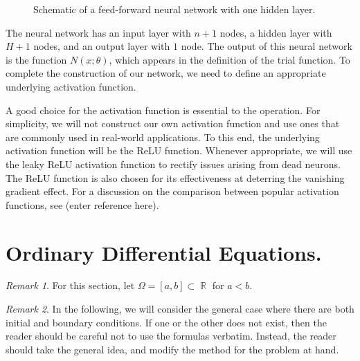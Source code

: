 \documentclass[10pt]{article}
\theoremstyle{plain}
\theoremstyle{definition}
\theoremstyle{remark}
\newtheorem{remark}{Remark}[section]
\numberwithin{theorem}{section}
\numberwithin{proposition}{section}
\numberwithin{remark}{section}
\numberwithin{corollary}{section}
\numberwithin{definition}{section}
\numberwithin{lemma}{section}
\numberwithin{equation}{section}
\DeclareMathOperator{\R}{\mathbb{R}}
\begin{document}
\begin{figure} [H]
	\caption{Schematic of a feed-forward neural network with one hidden layer.}
\end{figure}
The neural network has an input layer with $n+1$ nodes, a hidden layer with $H+1$ nodes, and an output layer with $1$ node. The output of this neural network is the function $N(x;\theta)$, which appears in the definition of the trial function. To complete the construction of our network, we need to define an appropriate underlying activation function. 

A good choice for the activation function is essential to the operation. For simplicity, we will not construct our own activation function and use ones that are commonly used in real-world applications. To this end, the underlying activation function will be the ReLU function. Whenever appropriate, we will use the leaky ReLU activation function to rectify issues arising from dead neurons. The ReLU function is also chosen for its effectiveness at deterring the vanishing gradient effect. For a discussion on the comparison between popular activation functions, see (enter reference here). 
\section{Ordinary Differential Equations.}
\begin{remark}
	For this section, let $\Omega = [a,b] \subset \R$ for $a < b$. 
\end{remark}
\begin{remark}
	In the following, we will consider the general case where there are both initial and boundary conditions. If one or the other does not exist, then the reader should be careful not to use the formulas verbatim. Instead, the reader should take the general idea, and modify the method for the problem at hand. 
\end{remark}
\end{document}
